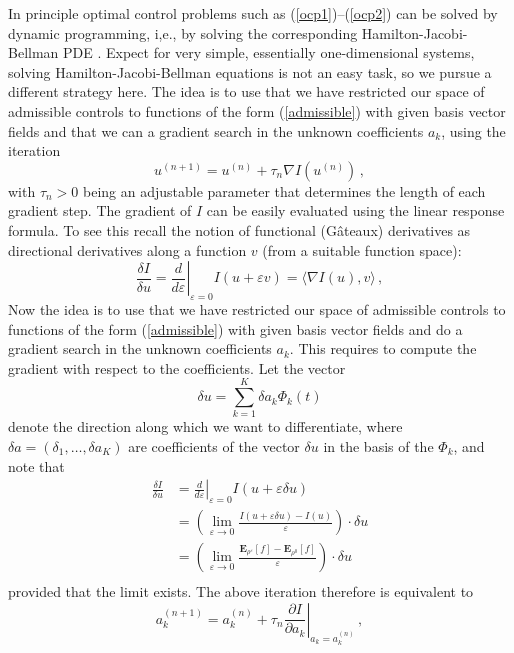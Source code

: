 \documentclass[]{tMPH2e}
\newcommand{\eps}{\varepsilon}
\newcommand{\bE}{{\mathbf E}}
\newcommand{\wrt}{with respect to }
\begin{document}
In principle optimal control problems such as (\ref{ocp1})--(\ref{ocp2}) can be solved by dynamic programming, i,e., by solving the corresponding Hamilton-Jacobi-Bellman PDE \cite{fleming2006}. Expect for very simple, essentially one-dimensional systems, solving Hamilton-Jacobi-Bellman equations is not an easy task, so we pursue a different strategy here. The idea is to use that we have restricted our space of admissible controls to functions of the form (\ref{admissible}) with given basis vector fields and that we can a gradient search in the unknown coefficients $a_{k}$, using the iteration
\[
u^{(n+1)} = u^{(n)} + \tau_{n}\nabla I(u^{(n)})\,,
\]
with $\tau_{n}>0$ being an adjustable parameter that determines the length of each gradient step. The gradient of $I$ can be easily evaluated using the linear response formula. To see this recall the notion of functional (G\^ateaux) derivatives as directional derivatives along a function $v$ (from a suitable function space): 
\begin{equation*}
\frac{\delta I}{\delta u} = \left.\frac{d}{d\eps}\right|_{\eps=0} I(u+\eps v) = \langle\nabla I(u),v\rangle\,,
\end{equation*} 
Now the idea is to use that we have restricted our space of admissible controls to functions of the form (\ref{admissible}) with given basis vector fields and do a gradient search in the unknown coefficients $a_{k}$. This requires to compute the gradient \wrt the coefficients. Let the vector  
\[
\delta u = \sum_{k=1}^K \delta a_k \Phi_k(t)
\]   
denote the direction along which we want to differentiate, where $\delta a=(\delta_{1},\ldots,\delta a_{K})$ are coefficients of the vector $\delta u$ in the basis of the $\Phi_{k}$, and note that 
\begin{equation*}
\begin{aligned}
\frac{\delta I}{\delta u} & = \left.\frac{d}{d\eps}\right|_{\eps=0} I(u+\eps \delta u)\\
& = \left(\lim_{\eps\to 0}\frac{I(u+\eps\delta u) - I(u)}{\eps}\right)\cdot \delta u\\
& = \left(\lim_{\eps\to 0}\frac{\bE_{\rho^{\eps}}[f] - \bE_{\rho^{0}}[f]}{\eps}\right)\cdot\delta u\\
\end{aligned}
\end{equation*} 
provided that the limit exists. The above iteration therefore is equivalent to
\begin{equation}\label{gd}
a_{k}^{(n+1)} = a_{k}^{(n)} + \tau_{n}\left.\frac{\partial I}{\partial a_{k}}\right|_{a_{k}=a_{k}^{(n)}}\,,
\end{equation}
\end{document}
